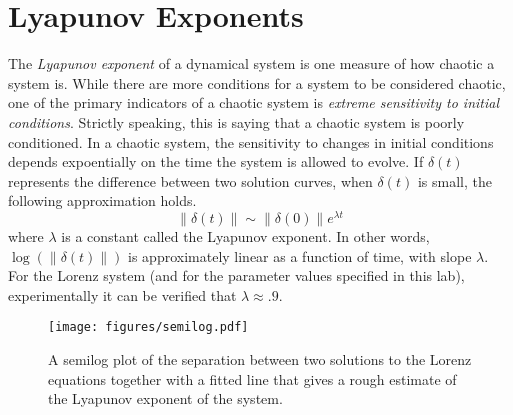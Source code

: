 \begin{comment}
If our system is very chaotic, then even small round off errors in your computer can lead to drastically different solutions.

\begin{problem}
Now set one initial condition.
Use \li{odeint} to solve the system, but use the arguments \li{atol=1E-14}, \li{rtol=1E-12}, and then again with \li{atol=1E-15}, \li{rtol=1E-13}.
Animate both solutions on the same plot.
\end{problem}
\end{comment}

\section*{Lyapunov Exponents}
The \textit{Lyapunov exponent} of a dynamical system is one measure of how chaotic a system is.
While there are more conditions for a system to be considered chaotic, one of the primary indicators of a chaotic system is \textit{extreme sensitivity to initial conditions}.
Strictly speaking, this is saying that a chaotic system is poorly conditioned.
In a chaotic system, the sensitivity to changes in initial conditions depends expoentially on the time the system is allowed to evolve.
If $\delta(t)$ represents the difference between two solution curves, when $\delta(t)$ is small, the following approximation holds.
\[\|\delta(t)\| \sim \|\delta(0)\| e^{\lambda t}\]
where $\lambda$ is a constant called the Lyapunov exponent. In other words, $\log(\|\delta(t)\|)$ is approximately linear as a function of time, with slope $\lambda$.
For the Lorenz system (and for the parameter values specified in this lab), experimentally it can be verified that $\lambda \approx .9$.

\begin{figure}
\texttt{[image: figures/semilog.pdf]}
\caption{A semilog plot of the separation between two solutions to the Lorenz equations together with a fitted line that gives a rough estimate of the Lyapunov exponent of the system.}
\label{fig:lyapunov_exponent}
\end{figure}

